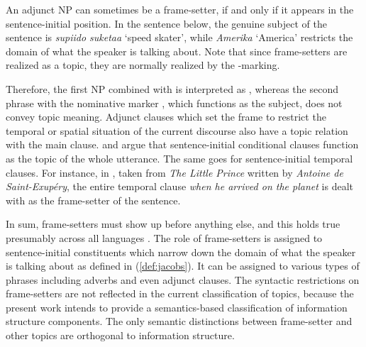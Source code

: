 \noindent An adjunct NP can sometimes be a frame-setter, if and only
if it appears in the sentence-initial position. In the 
sentence  below, the genuine subject of
the sentence is \textit{supiido suketaa} `speed skater', while
\textit{Amerika} `America' restricts the domain of what the speaker is
talking about. Note that since frame-setters are realized as a topic,
they are normally realized by the
\wa-marking.



\noindent Therefore, the first NP combined with \wa is interpreted as
, whereas the second phrase with the nominative marker \ga, which
functions as the subject, does not convey topic meaning.  Adjunct
clauses which set the frame to restrict the temporal or spatial
situation of the current discourse also have a topic relation with the
main clause.  \citet{haiman:78} and \citet{ramsay:87} argue that
sentence-initial conditional clauses function as the topic of the
whole utterance.  The same goes for sentence-initial temporal
clauses. For instance, in , taken from \textit{The
  Little Prince} written by \textit{Antoine de Saint-Exup{\'e}ry}, the
entire temporal clause \textit{when he arrived on the planet} is dealt
with as the frame-setter of the sentence.



















In sum, frame-setters must show up before anything else, and this
holds true presumably across all languages
\citep{chafe:76,lambrecht:96}. The role of frame-setters is assigned
to sentence-initial constituents which narrow down the domain of what
the speaker is talking about as defined in (\ref{def:jacobs}).  It can
be assigned to various types of phrases including adverbs and even
adjunct clauses.  The syntactic restrictions on frame-setters are not
reflected in the current classification of topics, because the present
work intends to provide a semantics-based classification of
information structure components.  The only semantic distinctions
between frame-setter and other topics are orthogonal to information
structure.









